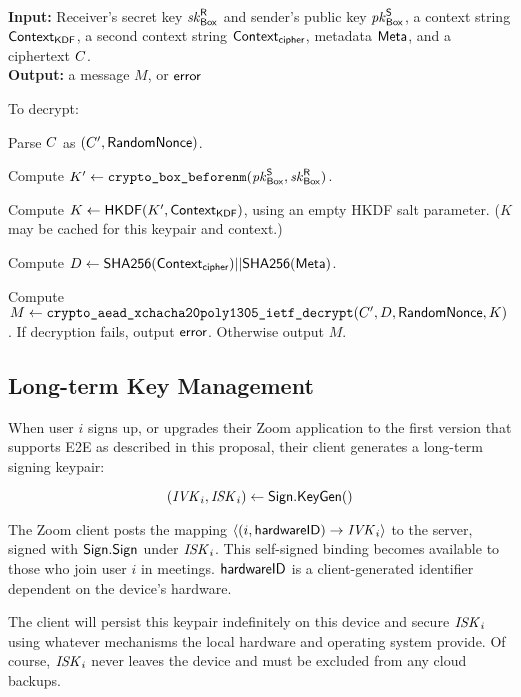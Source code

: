 
{\underline {\bf \cboxdecrypt}} \\
{\bf Input:} Receiver's secret key $\mathit{sk}_{{\sf Box}}^{\sf R}$ and sender's public key $\mathit{pk}_{{\sf Box}}^{\sf S}$, a context string ${\sf Context}_\textsf{KDF}$, a second context string ${\sf Context}_\textsf{cipher}$, metadata ${\sf Meta}$, and a ciphertext $C$. \\
{\bf Output:} a message $M$, or ${\sf error}$

To decrypt:

\vspace{-1em}
\begingroup
\RaggedRight
\begin{enumerate*}
\item Parse $C$ as $(C', {\sf RandomNonce})$.
\item Compute $K' \leftarrow \texttt{crypto\_box\_beforenm}(\mathit{pk}_{{\sf Box}}^{\sf S}, \mathit{sk}_{{\sf Box}}^{\sf R})$.
\item Compute $K \leftarrow {\sf HKDF}(K', {\sf Context}_\textsf{KDF})$, using an empty HKDF salt parameter. ($K$ may be cached for this keypair and context.)
\item Compute $D \leftarrow {\sf SHA256}({\sf Context}_\textsf{cipher}) || {\sf SHA256}({\sf Meta})$.
\item Compute $M \leftarrow \texttt{crypto\_aead\_xchacha20poly1305\_ietf\_decrypt}(C', D, {\sf RandomNonce}, K)$. If decryption fails, output ${\sf error}$. Otherwise output $M$.
\end{enumerate*}
\endgroup

\subsection{Long-term Key Management}
\label{sec:keymanage}

When user $i$ signs up, or upgrades their Zoom application to the first version that supports E2E as described in this proposal, their client generates a long-term signing keypair:

\[
(\mathit{IVK}_i, \mathit{ISK}_i) \leftarrow {\sf Sign}.\mathsf{KeyGen}()
\]

The Zoom client posts the mapping $\langle (i, {\sf hardwareID}) \rightarrow \mathit{IVK}_i \rangle$ to the server, signed with
${\sf Sign}.\mathsf{Sign}$ under $\mathit{ISK}_i$. This self-signed binding becomes available to those who join user $i$ in meetings.
${\sf hardwareID}$ is a client-generated identifier dependent on the device's hardware.

The client will persist this keypair indefinitely on this device and secure $\mathit{ISK}_i$ using whatever mechanisms the local hardware and operating system provide. Of course, $\mathit{ISK}_i$ never leaves the device and must be excluded from any cloud backups.

